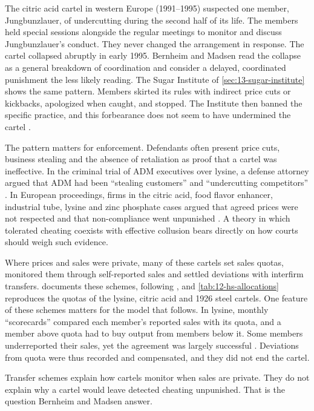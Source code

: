 The citric acid cartel in western Europe (1991--1995) suspected one member, Jungbunzlauer, of undercutting
during the second half of its life. The members held special sessions alongside the regular meetings to
monitor and discuss Jungbunzlauer's conduct. They never changed the arrangement in response. The cartel
collapsed abruptly in early 1995. Bernheim and Madsen read the collapse as a general breakdown of
coordination and consider a delayed, coordinated punishment the less likely reading. The Sugar Institute of
\cref{sec:13-sugar-institute} shows the same pattern. Members skirted its rules with indirect price cuts or kickbacks,
apologized when caught, and stopped. The Institute then banned the specific practice, and this forbearance
does not seem to have undermined the cartel \citep{GenesoveMullin2001}.

The pattern matters for enforcement. Defendants often present price cuts, business stealing and the absence
of retaliation as proof that a cartel was ineffective. In the criminal trial of ADM executives over lysine, a
defense attorney argued that ADM had been ``stealing customers'' and ``undercutting competitors''
\citep[footnote 10]{BernheimMadsen2017}. In European proceedings, firms in the citric acid, food flavor
enhancer, industrial tube, lysine and zinc phosphate cases argued that agreed prices were not respected and
that non-compliance went unpunished \citep[footnote 11]{BernheimMadsen2017}. A theory in which tolerated
cheating coexists with effective collusion bears directly on how courts should weigh such evidence.

Where prices and sales were private, many of these cartels set sales quotas, monitored them through self-reported
sales and settled deviations with interfirm transfers.  documents these schemes, following
\citet{HarringtonSkrzypacz2011}, and \cref{tab:12-hs-allocations} reproduces the quotas of the lysine, citric acid
and 1926 steel cartels. One feature of these schemes matters for the model that follows. In lysine, monthly
``scorecards'' compared each member's reported sales with its quota, and a member above quota had to buy output
from members below it. Some members underreported their sales, yet the agreement was largely successful
\citep[p.~2426]{HarringtonSkrzypacz2011}. Deviations from quota were thus recorded and compensated, and they did
not end the cartel.

Transfer schemes explain how cartels monitor when sales are private. They do not explain why a cartel would
leave detected cheating unpunished. That is the question Bernheim and Madsen answer.

